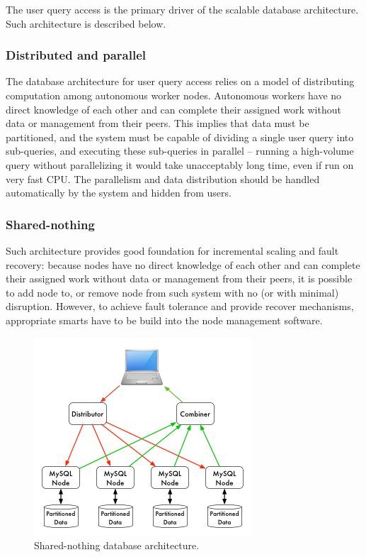 \documentclass[DM,lsstdraft,toc]{lsstdoc}
\begin{document}
The user query access is the primary driver of the scalable database
architecture. Such architecture is described below.

\subsubsection{Distributed and parallel}\label{distributed-and-parallel}

The database architecture for user query access relies on a model of
distributing computation among autonomous worker nodes. Autonomous
workers have no direct knowledge of each other and can complete their
assigned work without data or management from their peers. This implies
that data must be partitioned, and the system must be capable of
dividing a single user query into sub-queries, and executing these
sub-queries in parallel -- running a high-volume query without
parallelizing it would take unacceptably long time, even if run on very
fast CPU. The parallelism and data distribution should be handled
automatically by the system and hidden from users.

\subsubsection{Shared-nothing}\label{shared-nothing}

Such architecture provides good foundation for incremental scaling and
fault recovery: because nodes have no direct knowledge of each other and
can complete their assigned work without data or management from their
peers, it is possible to add node to, or remove node from such system
with no (or with minimal) disruption. However, to achieve fault
tolerance and provide recover mechanisms, appropriate smarts have to be
build into the node management software.

\begin{figure}[H]
\centering
\includegraphics{_static/shared_nothing_arch.png}
\caption{Shared-nothing database architecture.}
\end{figure}
\end{document}
